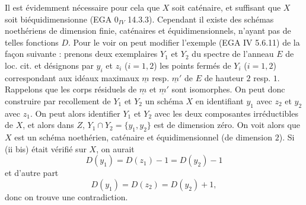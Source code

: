 

Il est
évidemment nécessaire pour cela que $X$ soit caténaire, et suffisant que $X$ soit biéquidimensionne (EGA $0_{IV}$ 14.3.3). Cependant il existe des schémas noethériens de dimension finie, caténaires et équidimensionnels, n'ayant pas de telles fonctions $D$. Pour le voir on peut modifier l'exemple (EGA IV 5.6.11) de la façon suivante : prenons deux exemplaires $Y_1$ et $Y_2$ du spectre de l'anneau $E$ de loc. cit. et désignons par $y_i$ et $z_i$ ($i=1,2$) les points fermés de $Y_i$ ($i=1,2$) correspondant aux idéaux maximaux $\underline{m}$ resp. $\underline{m}'$ de $E$ de hauteur $2$ resp. $1$. Rappelons que les corps résiduels de $\underline{m}$ et $\underline{m}'$ sont isomorphes. On peut donc construire par recollement de $Y_1$ et $Y_2$ un schéma $X$ en identifiant $y_1$ avec $z_2$ et $y_2$ avec $z_1$. On peut alors identifier $Y_1$ et $Y_2$ avec les deux composantes irréductibles de $X$, et alors dans $Z$, $Y_1\cap Y_2=\{y_1,y_2\}$ est de dimension zéro. On voit alors que $X$ est un schéma noethérien, caténaire et équidimensionnel (de dimension $2$). Si (ii bis) était vérifié sur $X$, on aurait
\[
D(y_1)=D(z_1)-1=D(y_2)-1
\]
et d'autre part
\[
D(y_1)=D(z_2)=D(y_2)+1,
\]
donc on trouve une contradiction.

